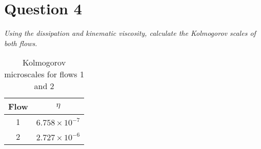 \section*{Question 4}
\emph{Using the dissipation and kinematic viscosity, calculate the Kolmogorov scales of both flows.}

\begin{table}[!ht]
\centering
\caption{Kolmogorov microscales for flows 1 and 2}
\label{kolm}
\begin{tabular}{c|c}
Flow & $\eta$ \\
\hline
1 & $6.758 \times 10^{-7}$ \\
2 & $2.727 \times 10^{-6}$
\end{tabular}
\end{table}
